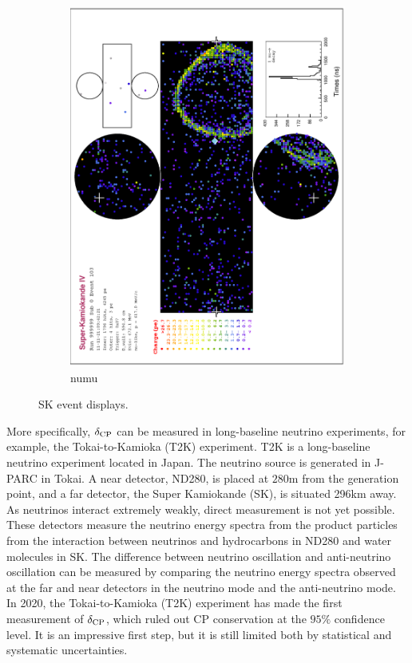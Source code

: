 \begin{figure}
\begin{subfigure}[b]{\dbfigwid\textwidth}
               \includegraphics[width=\dbfigwid\textwidth]{figures/t2k/sk-numu.eps}
               \caption{numu}
               \label{subfig:sk-numu}
          \end{subfigure}
          \caption{SK event displays.}
          \label{fig:sk-e-mu}
    \end{figure}


More specifically, $\delta_\textrm{CP}$ can be measured in long-baseline neutrino experiments, for example, the Tokai-to-Kamioka (T2K) experiment\cite{T2KEXP}. 
T2K is a long-baseline neutrino experiment located in Japan. 
The neutrino source is generated in J-PARC in Tokai. 
A near detector, ND280, is placed at $280\mathrm{m}$ from the generation point, and a far detector, the Super Kamiokande (SK), is situated 296km away. As neutrinos interact extremely weakly, direct measurement is not yet possible. These detectors measure the neutrino energy spectra from the product particles from the interaction between neutrinos and hydrocarbons in ND280 and water molecules in SK. The difference between neutrino oscillation and anti-neutrino oscillation can be measured by comparing the neutrino energy spectra observed at the far and near detectors in the neutrino mode and the anti-neutrino mode. In 2020, the Tokai-to-Kamioka (T2K) experiment\cite{T2KEXP} has made the first measurement of $\delta_\textrm{CP}$\cite{T2Knature}, which ruled out CP conservation at the $95\%$ confidence level. It is an impressive first step, but it is still limited both by statistical and systematic uncertainties. 

